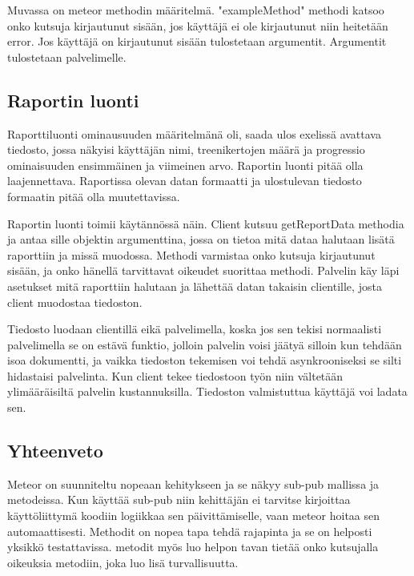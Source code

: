 Muvassa on meteor methodin määritelmä. "exampleMethod"{} methodi katsoo onko kutsuja kirjautunut sisään, jos käyttäjä ei ole kirjautunut niin heitetään error.
Jos käyttäjä on kirjautunut sisään tulostetaan argumentit. Argumentit tulostetaan palvelimelle.  





\subsection*{Raportin luonti}


Raporttiluonti ominausuuden määritelmänä oli, saada ulos exelissä avattava tiedosto, jossa näkyisi käyttäjän nimi, treenikertojen määrä ja progressio ominaisuuden ensimmäinen ja viimeinen arvo.
Raportin luonti pitää olla laajennettava. Raportissa olevan datan formaatti ja ulostulevan tiedosto formaatin pitää olla muutettavissa.
\medskip



Raportin luonti toimii käytännössä näin.
Client kutsuu getReportData methodia ja antaa sille objektin argumenttina, jossa on tietoa mitä dataa halutaan lisätä raporttiin ja missä muodossa.
Methodi varmistaa onko kutsuja kirjautunut sisään, ja onko hänellä tarvittavat oikeudet suorittaa methodi.
Palvelin käy läpi asetukset mitä raporttiin halutaan ja lähettää datan takaisin clientille, josta client muodostaa tiedoston.
\medskip


Tiedosto luodaan clientillä eikä palvelimella, koska jos sen tekisi normaalisti palvelimella se on estävä funktio,
jolloin palvelin voisi jäätyä silloin kun tehdään isoa dokumentti, ja 
vaikka tiedoston tekemisen voi tehdä asynkrooniseksi se silti hidastaisi palvelinta. 
Kun client tekee tiedostoon työn niin vältetään ylimääräisiltä palvelin kustannuksilla.
Tiedoston valmistuttua käyttäjä voi ladata sen.
\medskip


\subsection*{Yhteenveto}

Meteor on suunniteltu nopeaan kehitykseen ja se näkyy sub-pub mallissa ja metodeissa.
Kun käyttää sub-pub niin kehittäjän ei tarvitse kirjoittaa käyttöliittymä koodiin logiikkaa sen päivittämiselle, vaan meteor hoitaa sen automaattisesti.
Methodit on nopea tapa tehdä rajapinta ja se on helposti yksikkö testattavissa. metodit myös luo helpon tavan tietää onko kutsujalla oikeuksia metodiin, joka luo lisä turvallisuutta.
\medskip

